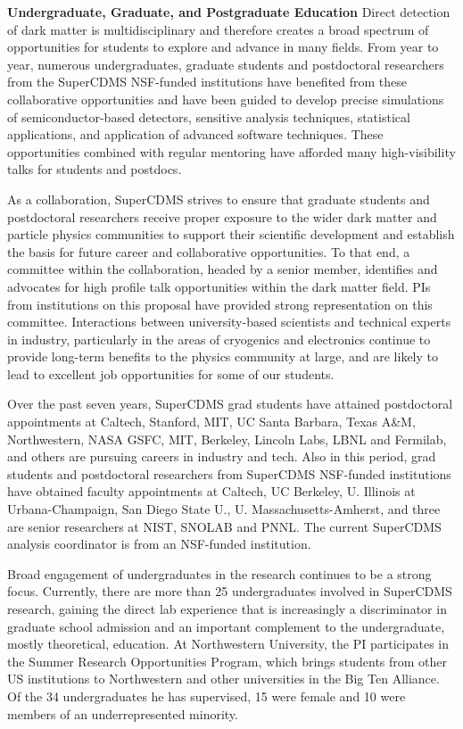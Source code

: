 \textbf{Undergraduate, Graduate, and Postgraduate Education}
Direct detection of dark matter is multidisciplinary and therefore creates a broad spectrum of opportunities for students to explore and advance in many fields. From year to year, numerous undergraduates, graduate students and postdoctoral researchers from the SuperCDMS NSF-funded institutions have benefited from these collaborative opportunities and have been guided to develop precise simulations of semiconductor-based detectors, sensitive analysis techniques, statistical applications, and application of advanced software techniques. These opportunities combined with regular mentoring have afforded many high-visibility talks for students and postdocs. 

As a collaboration, SuperCDMS strives to ensure that graduate students and postdoctoral researchers receive proper exposure to the wider dark matter and particle physics communities to support their scientific development and establish the basis for future career and collaborative opportunities. To that end, a committee within the collaboration, headed by a senior member, identifies and advocates for high profile talk opportunities within the dark matter field. PIs from institutions on this proposal have provided strong representation on this committee. Interactions between university-based scientists and technical experts in industry, particularly in the areas of cryogenics and electronics continue to provide long-term benefits to the physics community at large, and are likely to lead to excellent job opportunities for some of our students.

Over the past seven years, SuperCDMS grad students have attained postdoctoral appointments at Caltech, Stanford, MIT, UC Santa Barbara, Texas A\&M, Northwestern, NASA GSFC, MIT, Berkeley, Lincoln Labs, LBNL and Fermilab, and others are pursuing careers in industry and tech. Also in this period, grad students and postdoctoral researchers from SuperCDMS NSF-funded institutions have obtained faculty appointments at Caltech, UC Berkeley, U. Illinois at Urbana-Champaign, San Diego State U., U. Massachusetts-Amherst, and three are senior researchers at NIST, SNOLAB and PNNL. The current SuperCDMS analysis coordinator is from an NSF-funded institution. 

Broad engagement of undergraduates in the research continues to be a strong focus. Currently, there are more than 25 undergraduates involved in SuperCDMS research, gaining the direct lab experience that is increasingly a discriminator in graduate school admission and an important complement to the undergraduate, mostly theoretical, education. At Northwestern University, the PI participates in the Summer Research Opportunities Program, which brings students from other US institutions to Northwestern and other universities in the Big Ten Alliance. Of the 34 undergraduates he has supervised, 15 were female and 10 were members of an underrepresented minority. 

